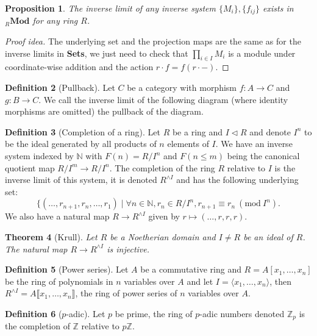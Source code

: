 \documentclass[paper=a4, fontsize=12pt]{scrartcl} %
\newtheorem{thm}{Theorem}
\newtheorem{prop}[thm]{Proposition}
\theoremstyle{definition}
\newtheorem{defn}[thm]{Definition}
\theoremstyle{remark}
\newcommand{\Mod}[1]{\ (\text{mod}\ #1)}
\newcommand{\N}{\mathbb{N}}
\newcommand{\Z}{\mathbb{Z}}
\begin{document}
\begin{prop}
	The inverse limit of any inverse system $\{M_i\}, \{f_{ij}\}$ exists in ${}_R\textbf{Mod}$ for any ring $R$.
\end{prop}
\begin{proof}[Proof idea]
	The underlying set and the projection maps are the same as for the inverse limits in \textbf{Sets}, we just need to check that $\prod_{i \in I} M_i$ is a module under coordinate-wise addition and the action $r\cdot f = f(r\cdot -)$.
\end{proof}
\begin{defn}[Pullback]
	Let $C$ be a category with morphism $f:A\rightarrow C$ and $g:B \rightarrow C$. We call the inverse limit of the following diagram (where identity morphisms are omitted) the pullback of the diagram.
	\begin{figure}[H]
		\centering
	\end{figure}
\end{defn}
\begin{defn}[Completion of a ring]
	Let $R$ be a ring and $I \lhd R$ and denote $I^n$ to be the ideal generated by all products of $n$ elements of $I$. We have an inverse system indexed by $\N$ with $F(n) = R/I^n$ and $F(n \leq m)$ being the canonical quotient map $R/I^m \rightarrow R/I^n$. The completion of the ring $R$ relative to $I$ is the inverse limit of this system, it is denoted $R^{\wedge I}$ and has the following underlying set:
	\[\{(\dots, r_{n+1}, r_n, \dots, r_1) \mid \forall n \in \N, r_n \in R/I^n, r_{n+1} \equiv r_n \Mod{I^n}.\]
	We also have a natural map $R\rightarrow R^{\wedge I}$ given by $r \mapsto (\dots, r,r,r)$.
\end{defn}
\begin{thm}[Krull]
	Let $R$ be a Noetherian domain and $I \neq R$ be an ideal of $R$. The natural map $R\rightarrow R^{\wedge I}$ is injective.
\end{thm}
\begin{defn}[Power series]
	Let $A$ be a commutative ring and $R = A[x_1, \dots, x_n]$ be the ring of polynomials in $n$ variables over $A$ and let $I = \langle x_1, \dots, x_n \rangle$, then $R^{\wedge I} = A\llbracket x_1, \dots, x_n\rrbracket$, the ring of power series of $n$ variables over $A$.
\end{defn}
\begin{defn}[$p$-adic]
	Let $p$ be prime, the ring of $p$-adic numbers denoted $\Z_p$ is the completion of $\Z$ relative to $p\Z$.
\end{defn}
\end{document}
